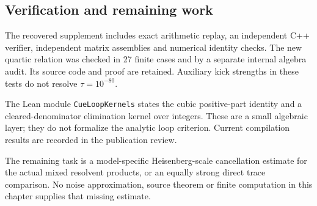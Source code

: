 \hypertarget{verification-and-remaining-work}{%
\subsection{Verification and remaining work}\label{verification-and-remaining-work}}

The recovered supplement includes exact arithmetic replay, an independent
C++ verifier, independent matrix assemblies and numerical identity checks.
The new quartic relation was checked in 27 finite cases and by a separate
internal algebra audit. Its source code and proof are retained. Auxiliary
kick strengths in these tests do not resolve \(\tau=10^{-80}\).

The Lean module \texttt{CueLoopKernels} states the cubic positive-part identity
and a cleared-denominator elimination kernel over integers. These are a
small algebraic layer; they do not formalize the analytic loop criterion.
Current compilation results are recorded in the publication review.

The remaining task is a model-specific Heisenberg-scale cancellation
estimate for the actual mixed resolvent products, or an equally strong
direct trace comparison. No noise approximation, source theorem or finite
computation in this chapter supplies that missing estimate.
